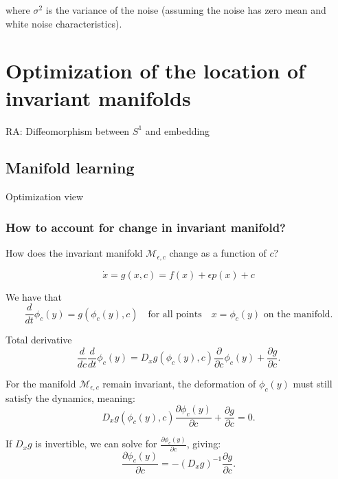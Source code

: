 \documentclass{article}
\theoremstyle{definition} \newtheorem{definition}{Definition}
\theoremstyle{remark} \newtheorem{remark}{Remark}
\newcommand{\manifold}{\mathcal{M}}
\newcounter{ct}
\begin{document}
where \( \sigma^2 \) is the variance of the noise (assuming the noise has zero mean and white noise characteristics).




\section{Optimization of the location of invariant manifolds} %
\citep{agrachev2009controllability,agrachev2022control}

RA: Diffeomorphism between $S^1$  and embedding

\citep{ocko2018emergent}

\subsection{Manifold learning}
\citep{chang2023novo}


Optimization view \citep{hennig2021learning}

\subsubsection{How to account for change in invariant manifold?}
How does the invariant manifold $\manifold_{\epsilon,c}$ change as a function of $c$?

\begin{equation}
\dot x = g(x,c) = f(x) + \epsilon p(x) + c
\end{equation}

We have that 
\begin{equation}
\frac{d}{dt} \phi_c(y) =g(\phi_c(y), c) \quad \text{for all points} \quad x = \phi_c(y) \text{ on the manifold}.
\end{equation}

Total derivative
\begin{equation}
\frac{d}{dc} \frac{d}{dt} \phi_c(y) = D_x g(\phi_c(y), c) \frac{\partial}{\partial c} \phi_c(y) + \frac{\partial g}{\partial c}.
\end{equation}


For the manifold $\manifold_{\epsilon,c}$ remain invariant, the deformation of $\phi_c(y)$ must still satisfy the dynamics, meaning:
\begin{equation}
D_x g(\phi_c(y), c) \frac{\partial \phi_c(y)}{\partial c} + \frac{\partial g}{\partial c} = 0.
\end{equation}

If $D_x g$ is invertible, we can solve for $\frac{\partial \phi_c(y)}{\partial c}$, giving:
\begin{equation}
\frac{\partial \phi_c(y)}{\partial c} = - (D_x g)^{-1} \frac{\partial g}{\partial c}.
\end{equation}
\end{document}
